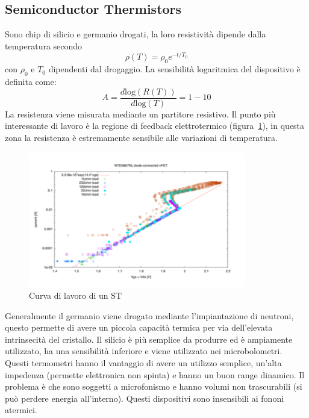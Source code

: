 \subsection{Semiconductor Thermistors}
Sono chip di silicio e germanio drogati, la loro resistivit\`a dipende dalla temperatura secondo
\begin{equation*}
\rho(T) = \rho_0 e^{-t/T_0}
\end{equation*}
con $\rho_0$ e $T_0$ dipendenti dal drogaggio.
La sensibilit\`a logaritmica del dispositivo \`e definita come:
\begin{equation*}
A = \frac{d\text{log}(R(T))}{d\text{log}(T)} = 1 - 10
\end{equation*}
La resistenza viene misurata mediante un partitore resistivo.
Il punto pi\`u interessante di lavoro \`e la regione di feedback elettrotermico (figura~\ref{fig:feedbackElettrotermico}), in questa
zona la resistenza \`e estremamente sensibile alle variazioni di temperatura.
\begin{figure}[htbp]
\begin{center}
\includegraphics[scale=1]{./Immagini/FeedbackElettrotermico.png}
\caption{Curva di lavoro di un ST}
\label{fig:feedbackElettrotermico}
\end{center}
\end{figure}
Generalmente il germanio viene drogato mediante l'impiantazione di neutroni, questo permette di avere un piccola capacit\`a termica per via dell'elevata
intrinsecit\`a del cristallo.
Il silicio \`e pi\`u semplice da produrre ed \`e ampiamente utilizzato, ha una sensibilit\`a inferiore e viene utilizzato nei microbolometri.\\
Questi termometri hanno il vantaggio di avere un utilizzo semplice, un'alta impedenza (permette elettronica non spinta) e hanno un 
buon range dinamico. 
Il problema \`e che sono soggetti a microfonismo e hanno volumi non trascurabili (si pu\`o perdere energia all'interno).
Questi dispositivi sono insensibili ai fononi atermici.
